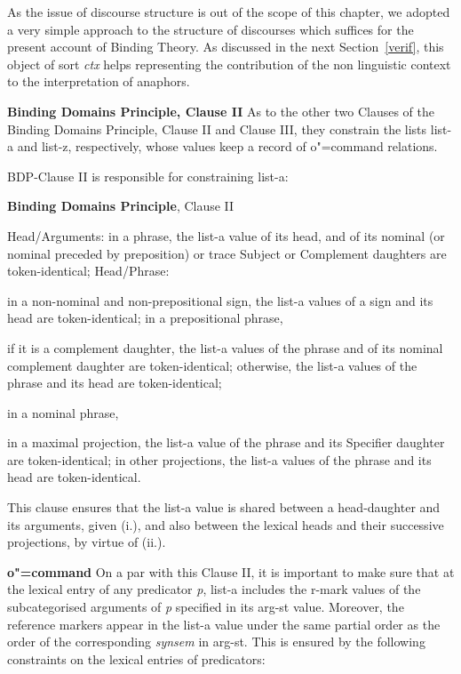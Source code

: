 \documentclass[output=paper
,modfonts
,nonflat]{langsci/langscibook}
\begin{document}
As the issue of discourse structure is out
of the scope of this chapter, we adopted a very simple approach to the 
structure of discourses
which suffices for the present account of Binding Theory.
As discussed in the next \mbox{Section \ref{verif},} this object
of sort {\em ctx} helps representing the contribution of the non linguistic context to the 
interpretation of anaphors.

\textbf{Binding Domains Principle, Clause II} As to the other two Clauses of the Binding Domains Principle, 
Clause II and Clause III,
they constrain the lists {\sc list-a} and {\sc list-z}, respectively,
whose values keep a record of o"=command relations.

BDP-Clause II is responsible for constraining {\sc list-a}:

\begin{exe}
\ex
\textbf{Binding Domains Principle}, Clause II
\begin{xlisti}
\ex	Head/Arguments: in a phrase, the {\sc list-a} value of its head, and of its nominal (or
nominal preceded by preposition) or trace Subject or Complement daughters are
token-identical;
\ex Head/Phrase:
\begin{xlisti}
\ex	in a non-nominal and non-prepositional sign, the {\sc list-a} values of a sign and its
head are token-identical;
\ex	in a prepositional phrase,
\begin{itemize}
\ex if it is a complement daughter, the {\sc list-a} values of the phrase and of its nominal
complement daughter are token-identical;
\ex otherwise, the {\sc list-a} values of the phrase and its head are token-identical;
\end{itemize}
\ex	in a nominal phrase,
\begin{itemize} 
\ex in a maximal projection, the {\sc list-a} value of the phrase and its Specifier daughter
are token-identical;
\ex in other projections, the {\sc list-a} values of the phrase and its head are
token-identical.
\end{itemize}
\end{xlisti}
\end{xlisti}
\end{exe}

This clause ensures that the {\sc list-a} value is shared between a head-daughter and its arguments, given (i.),
and also between the lexical heads and their successive projections, by virtue of (ii.).

\textbf{o"=command} On a par with this Clause II, it is important to make sure
that at the lexical entry of any predicator {\it p}, {\sc list-a} includes 
the {\sc r-mark}
values of the  subcategorised arguments of {\it p} specified in its
{\sc arg-st} value. Moreover, the reference markers appear in the {\sc list-a} 
value under the same partial order as the order of the corresponding {\em synsem} 
in {\sc arg-st}. This is ensured by the following constraints on the lexical 
entries of predicators:
\end{document}
